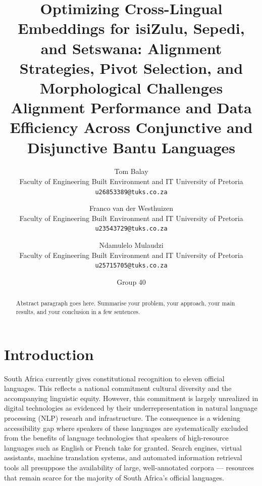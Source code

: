 \documentclass[11pt]{article}
\title{Optimizing Cross-Lingual Embeddings for isiZulu, Sepedi, 
and Setswana: Alignment Strategies, Pivot Selection, and 
Morphological Challenges \\[0.4em]
\medskip
\large Alignment Performance and Data Efficiency Across 
Conjunctive and Disjunctive Bantu Languages}
\author{
  Tom Balay \\          
  Faculty of Engineering Built Environment and IT 
  University of Pretoria \\
  \texttt{u26853389@tuks.co.za}        
  \and
  Franco van der Westhuizen  \\          
  Faculty of Engineering Built Environment and IT 
  University of Pretoria \\
  \texttt{u23543729@tuks.co.za}        
  \and
  Ndamulelo Mulaudzi \\
  Faculty of Engineering Built Environment and IT 
  University of Pretoria \\
  \texttt{u25715705@tuks.co.za} 
  \and
  Group 40       
}
\begin{document}
\maketitle   %

\begin{abstract}
  Abstract paragraph goes here. Summarise your problem, your approach,
  your main results, and your conclusion in a few sentences.
\end{abstract}


\section{Introduction}

South Africa currently gives constitutional recognition to eleven
official languages. This reflects a national commitment cultural
diversity and the accompanying linguistic equity. However, this
commitment is largely unrealized in digital technologies as 
evidenced by their underrepresentation in natural language processing 
(NLP) researh and infrastructure. The consequence is a widening 
accessibility gap where speakers of these languages are systematically 
excluded from the benefits of language technologies that speakers of 
high-resource languages such as English or French take for granted. 
Search engines, virtual assistants, machine translation systems, and 
automated information retrieval tools all presuppose the availability 
of large, well-annotated corpora — resources that remain scarce for 
the majority of South Africa's official languages.
\end{document}

